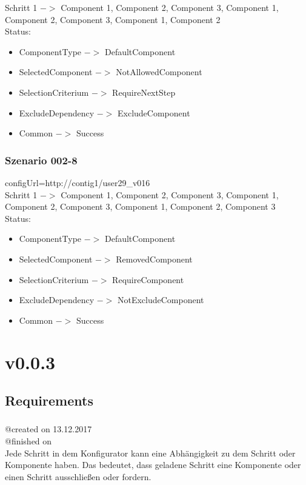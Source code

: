 \documentclass{article}
\begin{document}
\noindent Schritt 1 $->$ Component 1, Component 2, Component 3, Component 1,
Component 2, Component 3, Component 1, Component 2\\

\noindent Status:

\begin{itemize}
  \item ComponentType $->$ DefaultComponent
  \item SelectedComponent $->$ NotAllowedComponent
  \item SelectionCriterium $->$ RequireNextStep
  \item ExcludeDependency $->$ ExcludeComponent
  \item Common $->$ Success
\end{itemize}

\subsubsection{Szenario 002-8}

configUrl=http://contig1/user29\_v016\\

\noindent Schritt 1 $->$ Component 1, Component 2, Component 3, Component 1,
Component 2, Component 3, Component 1, Component 2, Component 3\\

\noindent Status:

\begin{itemize}
  \item ComponentType $->$ DefaultComponent
  \item SelectedComponent $->$ RemovedComponent
  \item SelectionCriterium $->$ RequireComponent
  \item ExcludeDependency $->$ NotExcludeComponent
  \item Common $->$ Success
\end{itemize}

\section{v0.0.3}

\subsection{Requirements}

\subsubsection{}
@created on 13.12.2017\\
@finished on \\
Jede Schritt in dem Konfigurator kann eine Abh\"angigkeit zu dem Schritt oder
Komponente haben. Das bedeutet, dass geladene Schritt eine Komponente oder einen
Schritt ausschlie\ss{}en oder fordern.\\
\end{document}
